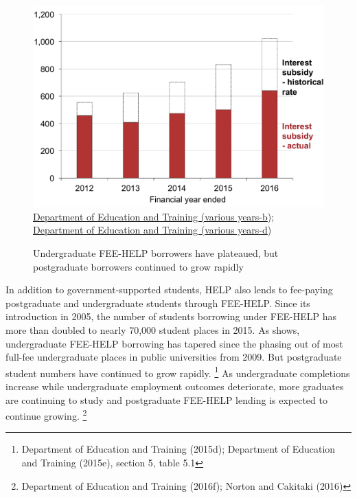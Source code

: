 \documentclass[embargoed]{grattan}
\begin{document}
\begin{figure}
\caption{Undergraduate FEE-HELP borrowers have plateaued, but postgraduate borrowers continued to grow rapidly}\label{fig:fig5-undergrad-HELP-borrowers-have-plateaued-but-postgrad-borrowers-continued-to-grow-rapidly}

\includegraphics[page=5]{atlas/Chartpack.pdf}
%
{\protect\hyperlink{_ENREF_36}{Department of Education and Training (various years-b}); \protect\hyperlink{_ENREF_38}{Department of Education and Training (various years-d})}
\end{figure}

In addition to government-supported students, HELP also lends to fee-paying postgraduate and undergraduate students through FEE-HELP.
Since its introduction in 2005, the number of students borrowing under FEE-HELP has more than doubled to nearly 70,000 student places in 2015.
As  shows, undergraduate FEE-HELP borrowing has tapered since the phasing out of most full-fee undergraduate places in public universities from 2009.
But postgraduate student numbers have continued to grow rapidly.%
\footnote{Department of Education and Training (2015d); Department of Education and Training (2015e), section 5, table 5.1} As undergraduate completions increase while undergraduate employment outcomes deteriorate, more graduates are continuing to study and postgraduate FEE-HELP lending is expected to continue growing.%
\footnote{Department of Education and Training (2016f); Norton and Cakitaki (2016)}
\end{document}
